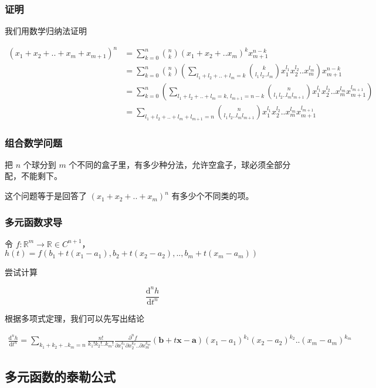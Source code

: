 \documentclass[12pt,a4paper]{ctexart}
\begin{document}
\subsubsection{证明}

我们用数学归纳法证明

\begin{align*}
(x_1 + x_2 + .. + x_m + x_{m+1})^n &= \sum_{k=0}^{n}\binom{n}{k}(x_1 + x_2 + .. x_m)^{k}x_{m+1}^{n-k} \\
&= \sum_{k=0}^{n}\binom{n}{k}\left( \sum_{l_1+l_2+..+l_m = k} \binom{k}{l_1\,l_2..l_m}x_1^{l_1}x_2^{l_2}..x_m^{l_m}\right)x_{m+1}^{n-k} \\
&= \sum_{k=0}^{n}\left( \sum_{l_1+l_2+..+l_m = k,\, l_{m+1} = n-k} \binom{n}{l_1\,l_2..l_ml_{m+1}}x_1^{l_1}x_2^{l_2}..x_m^{l_m}x_{m+1}^{l_{m+1}}\right) \\ 
&= \sum_{l_1+l_2+..+l_m + l_{m+1} = n} \binom{n}{l_1\,l_2..l_ml_{m+1}}x_1^{l_1}x_2^{l_2}..x_m^{l_m}x_{m+1}^{l_{m+1}}
\end{align*}

\subsubsection{组合数学问题}

把 $n$ 个球分到 $m$ 个不同的盒子里，有多少种分法，允许空盒子，球必须全部分配，不能剩下。

这个问题等于是回答了 $(x_1 + x_2 + .. + x_m)^n$ 有多少个不同类的项。

\subsubsection{多元函数求导}

令 $f: \mathbb{R}^m \to \mathbb{R} \in C^{n+1}$， $h(t) = f(b_1 + t(x_1-a_1), b_2 + t(x_2-a_2), .., b_m + t(x_m - a_m))$

尝试计算 

\[
\frac{\text{d}^n h}{\text{d} t^n}
\]

根据多项式定理，我们可以先写出结论

\begin{align*}
\frac{\text{d}^n h}{\text{d} t^n} = \sum_{k_1 + k_2 + .. k_m = n}\frac{n!}{k_1!k_2!..k_m!}\frac{\partial ^n f}{\partial x_1^{k_1}\partial x_2^{k_2}..\partial x_m^{k_m}}(\mathbf{b} + t \mathbf{x-a})(x_1-a_1)^{k_1}(x_2-a_2)^{k_2}..(x_m-a_m)^{k_m}
\end{align*}


\subsection{多元函数的泰勒公式}
\end{document}
